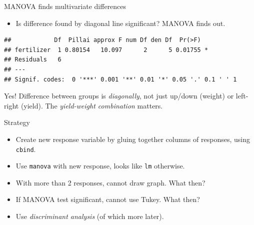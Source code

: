 \begin{frame}[fragile]{MANOVA finds multivariate differences}
  
  \begin{itemize}
  \item Is difference found by diagonal line significant? MANOVA finds out.

  \end{itemize}

  \begin{small}
\begin{knitrout}
\color{fgcolor}\begin{kframe}
\begin{alltt}
\hlkwb{=}
\hlkwb{=}\hlopt{~}
\end{alltt}
\begin{verbatim}
##            Df  Pillai approx F num Df den Df  Pr(>F)  
## fertilizer  1 0.80154   10.097      2      5 0.01755 *
## Residuals   6                                         
## ---
## Signif. codes:  0 '***' 0.001 '**' 0.01 '*' 0.05 '.' 0.1 ' ' 1
\end{verbatim}
\end{kframe}
\end{knitrout}
    
  \end{small}

Yes! Difference between groups is \emph{diagonally}, not just up/down
(weight) or left-right (yield). The \emph{yield-weight combination} matters.
  
\end{frame}

\begin{frame}[fragile]{Strategy}

\begin{itemize}
\item Create new response variable by gluing together columns of
  responses, using \texttt{cbind}.
\item Use \texttt{manova} with new response, looks like \texttt{lm} otherwise.
\item With more than 2 responses, cannot draw graph. What then?
\item If MANOVA test significant, cannot use Tukey. What then?
\item Use {\em discriminant analysis} (of which more later).
\end{itemize}

\end{frame}

